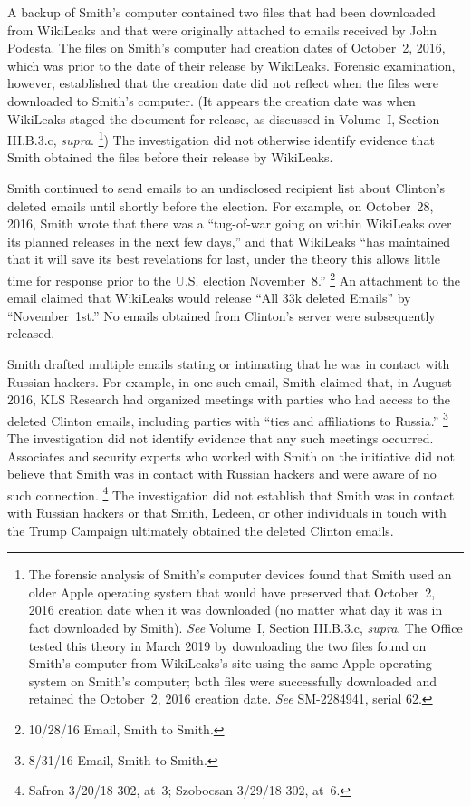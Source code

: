 A backup of Smith's computer contained two files that had been downloaded from WikiLeaks and that were originally attached to emails received by John Podesta.
The files on Smith's computer had creation dates of October~2, 2016, which was prior to the date of their release by WikiLeaks.
Forensic examination, however, established that the creation date did not reflect when the files were downloaded to Smith's computer.
(It appears the creation date was when WikiLeaks staged the document for release, as discussed in Volume~I, Section III.B.3.c, \textit{supra}.%
\footnote{The forensic analysis of Smith's computer devices found that Smith used an older Apple operating system that would have preserved that October~2, 2016 creation date when it was downloaded (no matter what day it was in fact downloaded by Smith).
\textit{See} Volume~I, Section III.B.3.c, \textit{supra}.
The Office tested this theory in March 2019 by downloading the two files found on Smith's computer from WikiLeaks's site using the same Apple operating system on Smith's computer;
both files were successfully downloaded and retained the October~2, 2016 creation date.
\textit{See} SM-2284941, serial 62.
})
The investigation did not otherwise identify evidence that Smith obtained the files before their release by WikiLeaks.

Smith continued to send emails to an undisclosed recipient list about Clinton's deleted emails until shortly before the election.
For example, on October~28, 2016, Smith wrote that there was a ``tug-of-war going on within WikiLeaks over its planned releases in the next few days,'' and that WikiLeaks ``has maintained that it will save its best revelations for last, under the theory this allows little time for response prior to the U.S. election November~8.''%
\footnote{10/28/16 Email, Smith to Smith.}
An attachment to the email claimed that WikiLeaks would release ``All 33k deleted Emails'' by ``November~1st.''
No emails obtained from Clinton's server were subsequently released.

Smith drafted multiple emails stating or intimating that he was in contact with Russian hackers.
For example, in one such email, Smith claimed that, in August 2016, KLS Research had organized meetings with parties who had access to the deleted Clinton emails, including parties with ``ties and affiliations to Russia.''%
\footnote{8/31/16 Email, Smith to Smith.}
The investigation did not identify evidence that any such meetings occurred.
Associates and security experts who worked with Smith on the initiative did not believe that Smith was in contact with Russian hackers and were aware of no such connection.%
\footnote{Safron 3/20/18 302, at~3; Szobocsan 3/29/18 302, at~6.}
The investigation did not establish that Smith was in contact with Russian hackers or that Smith, Ledeen, or other individuals in touch with the Trump Campaign ultimately obtained the deleted Clinton emails.

